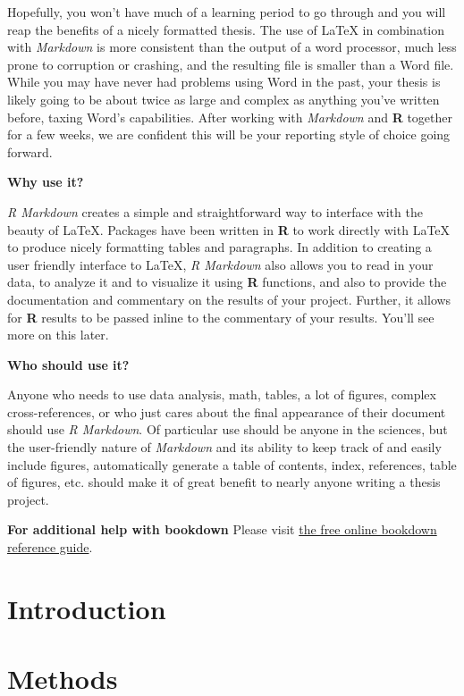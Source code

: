\documentclass[11pt,twoside]{bristolthesis}
\begin{document}
Hopefully, you won't have much of a learning period to go through and you will reap the benefits of a nicely formatted thesis. The use of LaTeX in combination with \emph{Markdown} is more consistent than the output of a word processor, much less prone to corruption or crashing, and the resulting file is smaller than a Word file. While you may have never had problems using Word in the past, your thesis is likely going to be about twice as large and complex as anything you've written before, taxing Word's capabilities. After working with \emph{Markdown} and \textbf{R} together for a few weeks, we are confident this will be your reporting style of choice going forward.

\textbf{Why use it?}

\emph{R Markdown} creates a simple and straightforward way to interface with the beauty of LaTeX. Packages have been written in \textbf{R} to work directly with LaTeX to produce nicely formatting tables and paragraphs. In addition to creating a user friendly interface to LaTeX, \emph{R Markdown} also allows you to read in your data, to analyze it and to visualize it using \textbf{R} functions, and also to provide the documentation and commentary on the results of your project. Further, it allows for \textbf{R} results to be passed inline to the commentary of your results. You'll see more on this later.

\textbf{Who should use it?}

Anyone who needs to use data analysis, math, tables, a lot of figures, complex cross-references, or who just cares about the final appearance of their document should use \emph{R Markdown}. Of particular use should be anyone in the sciences, but the user-friendly nature of \emph{Markdown} and its ability to keep track of and easily include figures, automatically generate a table of contents, index, references, table of figures, etc. should make it of great benefit to nearly anyone writing a thesis project.

\textbf{For additional help with bookdown}
Please visit \href{https://bookdown.org/yihui/bookdown/}{the free online bookdown reference guide}.

\hypertarget{introduction}{%
\chapter{Introduction}\label{introduction}}

\hypertarget{methods}{%
\chapter{Methods}\label{methods}}
\end{document}
